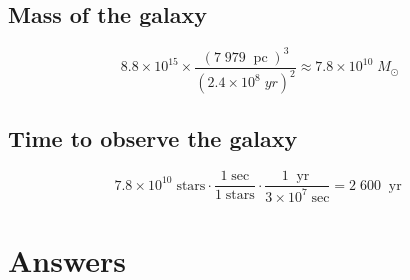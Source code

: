 \documentclass[11pt]{article}
\DeclareMathOperator{\pc}{pc}
\DeclareMathOperator{\yr}{yr}
\begin{document}
\subsection*{Mass of the galaxy}
\[8.8 \times 10^{15} \times \frac{(7\;979\;\pc)^3}{(2.4 \times 10^{8}\;yr)^2} \approx 7.8 \times 10^{10}\;M_\odot\]


\subsection*{Time to observe the galaxy}
\[7.8 \times 10^{10}\;\textrm{stars} \cdot \frac{1\;\textrm{sec}}{1\;\textrm{stars}} \cdot \frac{1\;\yr}{3 \times 10^{7}\;\textrm{sec}} = 2\;600\;\yr\]


\section{Answers}
\end{document}
